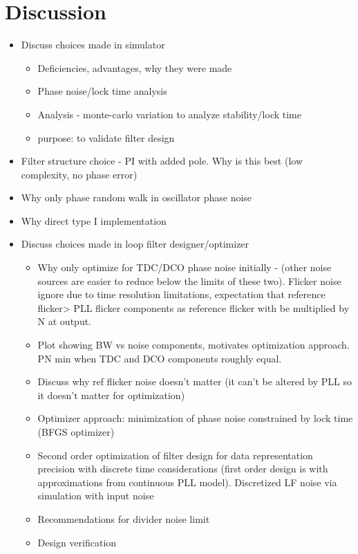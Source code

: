 \section{Discussion}\label{disco}
\begin{itemize}
	\item Discuss choices made in simulator
	\begin{itemize}
		\item Deficiencies, advantages, why they were made
		\item Phase noise/lock time analysis
		\item Analysis - monte-carlo variation to analyze stability/lock time
		\item purpose: to validate filter design
	\end{itemize}
	\item Filter structure choice - PI with added pole. Why is this best (low complexity, no phase error)
	\item Why only phase random walk in oscillator phase noise
	\item Why direct type I implementation
	\item Discuss choices made in loop filter designer/optimizer
	\begin{itemize}
		\item Why only optimize for TDC/DCO phase noise initially - (other noise sources are easier to reduce below the limits of these two). Flicker noise ignore due to time resolution limitations, expectation that reference flicker> PLL flicker components as reference flicker with be multiplied by N at output.
		\item Plot showing BW vs noise components, motivates optimization approach. PN min when TDC and DCO components roughly equal.
		\item Discuss why ref flicker noise doesn't matter (it can't be altered by PLL so it doesn't matter for optimization)
		\item Optimizer approach: minimization of phase noise constrained by lock time (BFGS optimizer)
		\item Second order optimization of filter design for data representation precision with discrete time considerations (first order design is with approximations from continuous PLL model). Discretized LF noise via simulation with input noise
		\item Recommendations for divider noise limit
		\item Design verification
	\end{itemize}

\end{itemize}
